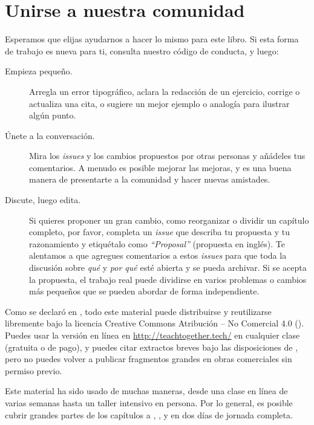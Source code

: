 \chapter{Unirse a nuestra comunidad}\label{s:joining}

Esperamos que elijas ayudarnos a hacer lo mismo para este libro.
Si esta forma de trabajo es nueva para ti,
consulta  nuestro código de conducta,
y luego:

\begin{description}

\item[Empieza pequeño.]
  Arregla un error tipográfico,
  aclara la redacción de un ejercicio,
  corrige o actualiza una cita,
  o sugiere un mejor ejemplo o analogía para ilustrar algún punto.

\item[Únete a la conversación.]
  Mira los \emph{issues} y los cambios propuestos por otras personas
  y añádeles tus comentarios.
  A menudo es posible mejorar las mejoras,
  y es una buena manera de presentarte a la comunidad y hacer nuevas amistades.

\item[Discute, luego edita.]
  Si quieres proponer un gran cambio,
  como reorganizar o dividir un capítulo completo,
  por favor, completa un \emph{issue} que describa tu propuesta y tu razonamiento y etiquétalo como  \emph{``Proposal''} (propuesta en inglés).
  Te alentamos a que agregues comentarios a estos \emph{issues}
  para que toda la discusión sobre \emph{qué} y \emph{por qué} esté abierta y se pueda archivar.
  Si se acepta la propuesta,
  el trabajo real puede dividirse en varios problemas o cambios más pequeños
  que se pueden abordar de forma independiente.
\end{description}


Como se declaró en ,
todo este material puede distribuirse y reutilizarse libremente
bajo la licencia Creative Commons Atribución – No Comercial 4.0
().
Puedes usar la versión en línea en \url{http://teachtogether.tech/} en cualquier clase (gratuita o de pago),
y puedes citar extractos breves bajo las disposiciones de ,
pero no puedes volver a publicar fragmentos grandes en obras comerciales sin permiso previo.

Este material ha sido usado de muchas maneras,
desde una clase en línea de varias semanas hasta un taller intensivo en persona.
Por lo general, es posible cubrir grandes partes de los capítulos  a ,
,
y  en dos días de jornada completa.


